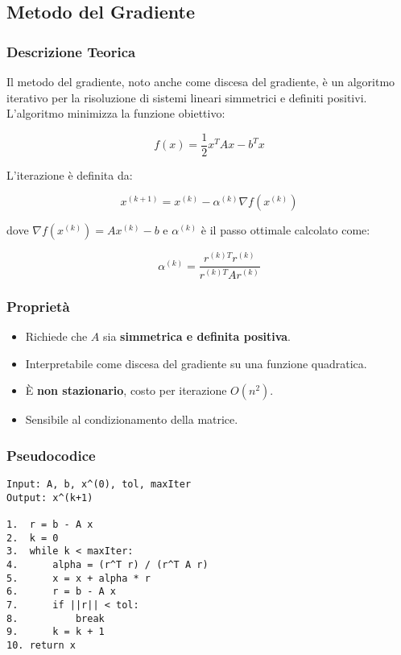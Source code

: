 \subsection{Metodo del Gradiente}

\subsubsection*{Descrizione Teorica}

Il metodo del gradiente, noto anche come discesa del gradiente, è un algoritmo iterativo per la risoluzione di sistemi lineari simmetrici e definiti positivi. L'algoritmo minimizza la funzione obiettivo:

\[
f(x) = \frac{1}{2}x^T A x - b^T x
\]

L'iterazione è definita da:

\[
x^{(k+1)} = x^{(k)} - \alpha^{(k)} \nabla f(x^{(k)})
\]

dove $\nabla f(x^{(k)}) = A x^{(k)} - b$ e $\alpha^{(k)}$ è il passo ottimale calcolato come:

\[
\alpha^{(k)} = \frac{r^{(k)T} r^{(k)}}{r^{(k)T} A r^{(k)}}
\]

\subsubsection*{Proprietà}
\begin{itemize}
    \item Richiede che \(A\) sia \textbf{simmetrica e definita positiva}.
    \item Interpretabile come discesa del gradiente su una funzione quadratica.
    \item È \textbf{non stazionario}, costo per iterazione \(O(n^2)\).
    \item Sensibile al condizionamento della matrice.
\end{itemize}

\subsubsection*{Pseudocodice}

\begin{footnotesize}
\begin{verbatim}
Input: A, b, x^(0), tol, maxIter
Output: x^(k+1)

1.  r = b - A x
2.  k = 0
3.  while k < maxIter:
4.      alpha = (r^T r) / (r^T A r)
5.      x = x + alpha * r
6.      r = b - A x
7.      if ||r|| < tol:
8.          break
9.      k = k + 1
10. return x
\end{verbatim}
\end{footnotesize}


